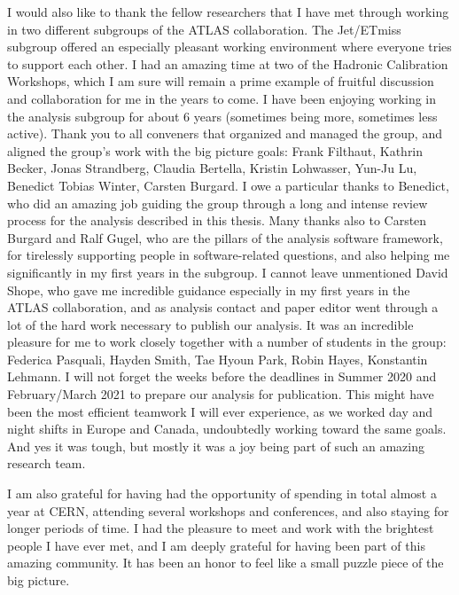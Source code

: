 I would also like to thank the fellow researchers that I have met through working in two different subgroups of the ATLAS collaboration. 
The Jet/ETmiss subgroup offered an especially pleasant working environment where everyone tries to support each other. I had an amazing time at two of the Hadronic Calibration Workshops, which I am sure will remain a prime example of fruitful discussion and collaboration for me in the years to come. 
I have been enjoying working in the \HWW analysis subgroup for about 6 years (sometimes being more, sometimes less active). Thank you to all conveners that organized and managed the group, and aligned the group's work with the big picture goals: Frank Filthaut, Kathrin Becker, Jonas Strandberg, Claudia Bertella, Kristin Lohwasser, Yun-Ju Lu, Benedict Tobias Winter, Carsten Burgard. 
I owe a particular thanks to Benedict, who did an amazing job guiding the group through a long and intense review process for the analysis described in this thesis. 
Many thanks also to Carsten Burgard and Ralf Gugel, who are the pillars of the analysis software framework, for tirelessly supporting people in software-related questions, and also helping me significantly in my first years in the \HWW subgroup. 
I cannot leave unmentioned David Shope, who gave me incredible guidance especially in my first years in the ATLAS collaboration, and as analysis contact and paper editor went through a lot of the hard work necessary to publish our analysis.
It was an incredible pleasure for me to work closely together with a number of students in the group: Federica Pasquali, Hayden Smith, Tae Hyoun Park, Robin Hayes, Konstantin Lehmann. 
I will not forget the weeks before the deadlines in Summer 2020 and February/March 2021 to prepare our analysis for publication.
This might have been the most efficient teamwork I will ever experience, as we worked day and night shifts in Europe and Canada, undoubtedly working toward the same goals.
And yes it was tough, but mostly it was a joy being part of such an amazing research team.

I am also grateful for having had the opportunity of spending in total almost a year at CERN, attending several workshops and conferences, and also staying for longer periods of time. 
I had the pleasure to meet and work with the brightest people I have ever met, and I am deeply grateful for having been part of this amazing community. 
It has been an honor to feel like a small puzzle piece of the big picture.

